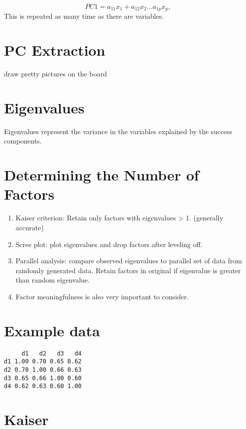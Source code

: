 \documentclass[
]{book}
\providecommand{\tightlist}{%
  \setlength{\itemsep}{0pt}\setlength{\parskip}{0pt}}
\begin{document}
\[
PC1 = a_{11}x_1 + a_{12}x_2 ... a_{1p}x_p, 
\]
This is repeated as many time as there are variables.

\hypertarget{pc-extraction}{%
\section{PC Extraction}\label{pc-extraction}}

draw pretty pictures on the board

\hypertarget{eigenvalues}{%
\section{Eigenvalues}\label{eigenvalues}}

Eigenvalues represent the variance in the variables explained by the success components.

\hypertarget{determining-the-number-of-factors}{%
\section{Determining the Number of Factors}\label{determining-the-number-of-factors}}

\begin{enumerate}
\def\labelenumi{\arabic{enumi}.}
\tightlist
\item
  Kaiser criterion: Retain only factors with eigenvalues \textgreater{} 1. (generally accurate)
\item
  Scree plot: plot eigenvalues and drop factors after leveling off.
\item
  Parallel analysis: compare observed eigenvalues to parallel set of data from randomly generated data. Retain factors in original if eigenvalue is greater than random eigenvalue.
\item
  Factor meaningfulness is also very important to consider.
\end{enumerate}

\hypertarget{example-data}{%
\section{Example data}\label{example-data}}

\begin{verbatim}
     d1   d2   d3   d4
d1 1.00 0.70 0.65 0.62
d2 0.70 1.00 0.66 0.63
d3 0.65 0.66 1.00 0.60
d4 0.62 0.63 0.60 1.00
\end{verbatim}

\hypertarget{kaiser}{%
\section{Kaiser}\label{kaiser}}
\end{document}
